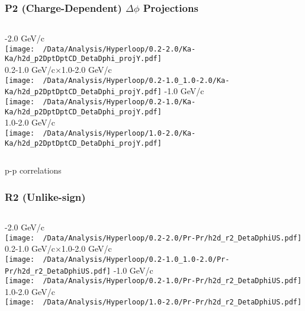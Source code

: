 \documentclass{beamer}
\begin{document}
\begin{frame}
	\frametitle{P2 (Charge-Dependent) $\Delta\phi$ Projections}
	\begin{columns}
		-2.0 GeV/c\\
		\texttt{[image: ~/Data/Analysis/Hyperloop/0.2-2.0/Ka-Ka/h2d\_p2DptDptCD\_DetaDphi\_projY.pdf]}\\0.2-1.0 GeV/c$\times$1.0-2.0 GeV/c\\
		\texttt{[image: ~/Data/Analysis/Hyperloop/0.2-1.0\_1.0-2.0/Ka-Ka/h2d\_p2DptDptCD\_DetaDphi\_projY.pdf]}
		-1.0 GeV/c\\
		\texttt{[image: ~/Data/Analysis/Hyperloop/0.2-1.0/Ka-Ka/h2d\_p2DptDptCD\_DetaDphi\_projY.pdf]}\\1.0-2.0 GeV/c\\
		\texttt{[image: ~/Data/Analysis/Hyperloop/1.0-2.0/Ka-Ka/h2d\_p2DptDptCD\_DetaDphi\_projY.pdf]}
	\end{columns}
\end{frame}
\begin{frame}
	\LARGE p-p correlations
\end{frame}
\begin{frame}
	\frametitle{R2 (Unlike-sign)}
	\begin{columns}
		\column{0.5\textwidth}
		-2.0 GeV/c\\
		\texttt{[image: ~/Data/Analysis/Hyperloop/0.2-2.0/Pr-Pr/h2d\_r2\_DetaDphiUS.pdf]}\\0.2-1.0 GeV/c$\times$1.0-2.0 GeV/c\\
		\texttt{[image: ~/Data/Analysis/Hyperloop/0.2-1.0\_1.0-2.0/Pr-Pr/h2d\_r2\_DetaDphiUS.pdf]}
		\column{0.5\textwidth}
		-1.0 GeV/c\\
		\texttt{[image: ~/Data/Analysis/Hyperloop/0.2-1.0/Pr-Pr/h2d\_r2\_DetaDphiUS.pdf]}\\1.0-2.0 GeV/c\\
		\texttt{[image: ~/Data/Analysis/Hyperloop/1.0-2.0/Pr-Pr/h2d\_r2\_DetaDphiUS.pdf]}
	\end{columns}
\end{frame}
\end{document}
